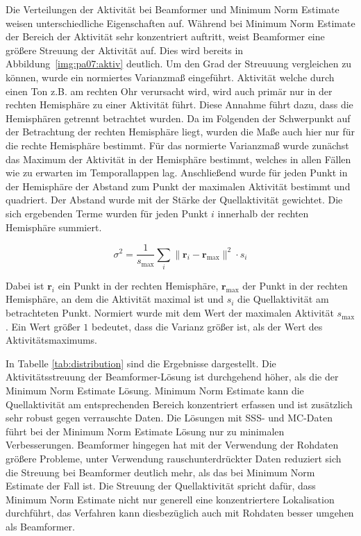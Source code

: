 \documentclass[doc,a4paper,12pt]{apa6}
\newcommand{\mx}[1]{\mathbf{#1}}
\begin{document}
Die Verteilungen der Aktivität bei Beamformer und Minimum Norm Estimate weisen unterschiedliche Eigenschaften auf. Während bei Minimum Norm Estimate der Bereich der Aktivität sehr konzentriert auftritt, weist Beamformer eine größere Streuung der Aktivität auf. Dies wird bereits in Abbildung~\ref{img:pa07:aktiv} deutlich. Um den Grad der Streuuung vergleichen zu können, wurde ein normiertes Varianzmaß eingeführt. Aktivität welche durch einen Ton z.B. am rechten Ohr verursacht wird, wird auch primär nur in der rechten Hemisphäre zu einer Aktivität führt. Diese Annahme führt dazu, dass die Hemisphären getrennt betrachtet wurden. Da im Folgenden der Schwerpunkt auf der Betrachtung der rechten Hemisphäre liegt, wurden die Maße auch hier nur für die rechte Hemisphäre bestimmt. Für das normierte Varianzmaß wurde zunächst das Maximum der Aktivität in der Hemisphäre bestimmt, welches in allen Fällen wie zu erwarten im Temporallappen lag. Anschließend wurde für jeden Punkt in der Hemisphäre der Abstand zum Punkt der maximalen Aktivität bestimmt und quadriert. Der Abstand wurde mit der Stärke der Quellaktivität gewichtet. Die sich ergebenden Terme wurden für jeden Punkt $i$ innerhalb der rechten Hemisphäre summiert.

\begin{equation}
\sigma^2 = \frac{1}{s_{\text{max}}} \sum_i \|\mx{r}_i - \mx{r}_{\text{max}}\|^2 \cdot s_i
\end{equation}

Dabei ist $\mx{r}_i$ ein Punkt in der rechten Hemisphäre, $\mx{r}_{\text{max}}$ der Punkt in der rechten Hemisphäre, an dem die Aktivität maximal ist und $s_i$ die Quellaktivität am betrachteten Punkt. Normiert wurde mit dem Wert der maximalen Aktivität $s_{\text{max}}$. Ein Wert größer $1$ bedeutet, dass die Varianz größer ist, als der Wert des Aktivitätsmaximums.

In Tabelle \ref{tab:distribution} sind die Ergebnisse dargestellt. Die Aktivitätsstreuung der Beamformer-Lösung ist durchgehend höher, als die der Minimum Norm Estimate Lösung. Minimum Norm Estimate kann die Quellaktivität am entsprechenden Bereich konzentriert erfassen und ist zusätzlich sehr robust gegen verrauschte Daten. Die Lösungen mit SSS- und MC-Daten führt bei der Minimum Norm Estimate Lösung nur zu minimalen Verbesserungen. Beamformer hingegen hat mit der Verwendung der Rohdaten größere Probleme, unter Verwendung rauschunterdrückter Daten reduziert sich die Streuung bei Beamformer deutlich mehr, als das bei Minimum Norm Estimate der Fall ist. Die Streuung der Quellaktivität spricht dafür, dass Minimum Norm Estimate nicht nur generell eine konzentriertere Lokalisation durchführt, das Verfahren kann diesbezüglich auch mit Rohdaten besser umgehen als Beamformer.
\end{document}

